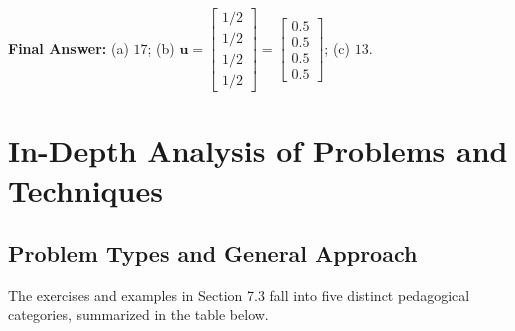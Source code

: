 \documentclass[11pt, letterpaper]{article}
\theoremstyle{definition}
\theoremstyle{remark}
\begin{document}
\textbf{Final Answer:} (a) $17$; \quad (b) $\mathbf{u} = \begin{bmatrix} 1/2 \\ 1/2 \\ 1/2 \\ 1/2 \end{bmatrix} = \begin{bmatrix} 0.5 \\ 0.5 \\ 0.5 \\ 0.5 \end{bmatrix}$; \quad (c) $13$.

\newpage
\section{In-Depth Analysis of Problems and Techniques}

\subsection{Problem Types and General Approach}
The exercises and examples in Section 7.3 fall into five distinct pedagogical categories, summarized in the table below.
\end{document}
